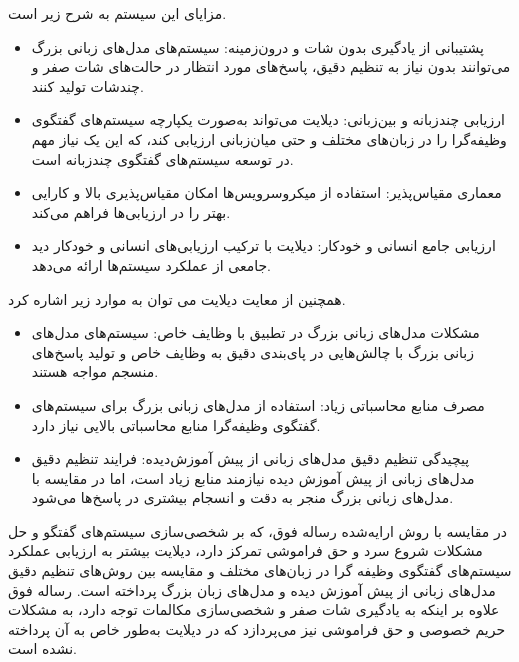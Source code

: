 \begin{enumerate}
 مزایای این سیستم به شرح زیر است.
\begin{itemize}
\item
پشتیبانی از یادگیری بدون شات و درون‌زمینه: سیستم‌های مدل‌های زبانی بزرگ می‌توانند بدون نیاز به تنظیم دقیق، پاسخ‌های مورد انتظار در حالت‌های شات صفر و چندشات تولید کنند.
\item
ارزیابی چندزبانه و بین‌زبانی: دیلایت می‌تواند به‌صورت یکپارچه سیستم‌های گفتگوی وظیفه‌گرا را در زبان‌های مختلف و حتی میان‌زبانی ارزیابی کند، که این یک نیاز مهم در توسعه سیستم‌های گفتگوی چندزبانه است.
\item
معماری مقیاس‌پذیر: استفاده از میکروسرویس‌ها امکان مقیاس‌پذیری بالا و کارایی بهتر را در ارزیابی‌ها فراهم می‌کند.
\item
ارزیابی جامع انسانی و خودکار: دیلایت با ترکیب ارزیابی‌های انسانی و خودکار دید جامعی از عملکرد سیستم‌ها ارائه می‌دهد.
\end{itemize}

همچنین از معایت دیلایت می توان به موارد زیر اشاره کرد.
\begin{itemize}
\item
مشکلات مدل‌های زبانی بزرگ در تطبیق با وظایف خاص: سیستم‌های مدل‌های زبانی بزرگ با چالش‌هایی در پای‌بندی دقیق به وظایف خاص و تولید پاسخ‌های منسجم مواجه هستند.
\item
مصرف منابع محاسباتی زیاد: استفاده از مدل‌های زبانی بزرگ برای سیستم‌های گفتگوی وظیفه‌گرا منابع محاسباتی بالایی نیاز دارد.
\item
پیچیدگی تنظیم دقیق مدل‌های زبانی از پیش آموزش‌دیده: فرایند تنظیم دقیق مدل‌های زبانی از پیش آموزش دیده نیازمند منابع زیاد است، اما در مقایسه با مدل‌های زبانی بزرگ منجر به دقت و انسجام بیشتری در پاسخ‌ها می‌شود.
\end{itemize}

در مقایسه با روش ارایه‌شده رساله فوق، که بر شخصی‌سازی سیستم‌های گفتگو و حل مشکلات شروع سرد و حق فراموشی تمرکز دارد، دیلایت بیشتر به ارزیابی عملکرد سیستم‌های گفتگوی وظیفه گرا در زبان‌های مختلف و مقایسه بین روش‌های تنظیم دقیق مدل‌های زبانی از پیش آموزش دیده و مدل‌های زبان بزرگ پرداخته است. رساله فوق علاوه بر اینکه به یادگیری شات صفر و شخصی‌سازی مکالمات توجه دارد، به مشکلات حریم خصوصی و حق فراموشی نیز می‌پردازد که در دیلایت به‌طور خاص به آن پرداخته نشده است. \\


\end{enumerate}
